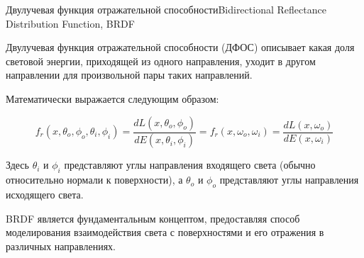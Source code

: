 \documentclass{beamer}
\begin{document}
	\begin{frame}{Двулучевая функция отражательной способности}{Bidirectional Reflectance Distribution Function, BRDF}
		
		Двулучевая функция отражательной способности (ДФОС) описывает какая доля световой энергии, приходящей из одного направления, уходит в другом направлении для произвольной пары таких направлений. 
		
		Математически выражается следующим образом:

		\[
			f_r (x, \theta_o, \phi_o, \theta_i, \phi_i) =
			\frac{d L(x, \theta_o, \phi_o)}{d E (x, \theta_i, \phi_i)}
			=
			f_r (x, \omega_o, \omega_i)
			=
			\frac{d L(x, \omega_o)}{d E (x, \omega_i)}
		\]

		Здесь \(\theta_i\) и \(\phi_i\) представляют углы направления входящего света (обычно относительно нормали к поверхности), а \(\theta_o\) и \(\phi_o\) представляют углы направления исходящего света. 

		BRDF является фундаментальным концептом,
		предоставляя способ моделирования взаимодействия света с поверхностями и его отражения в различных направлениях.

	\end{frame}
\end{document}
